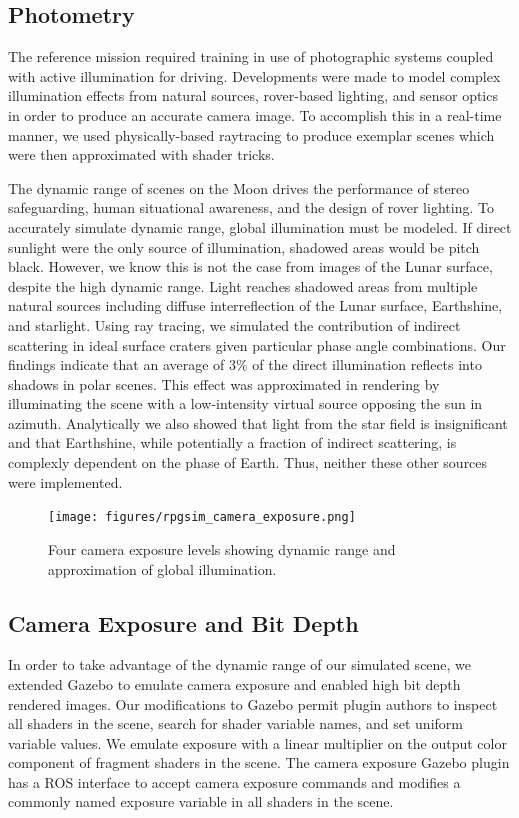 \documentclass[twocolumn,letterpaper]{IEEEAerospaceCLS}  %
\begin{document}
\subsection {Photometry}
The reference mission required training in use of photographic systems coupled with active illumination for driving. 
Developments were made to model complex illumination effects from natural sources, rover-based lighting, and sensor optics in order to produce an accurate camera image. 
To accomplish this in a real-time manner, we used physically-based raytracing to produce exemplar scenes which were then approximated with shader tricks. 

The dynamic range of scenes on the Moon drives the performance of stereo safeguarding, human situational awareness, and the design of rover lighting. 
To accurately simulate dynamic range, global illumination must be modeled. 
If direct sunlight were the only source of illumination, shadowed areas would be pitch black. 
However, we know this is not the case from images of the Lunar surface, despite the high dynamic range. 
Light reaches shadowed areas from multiple natural sources including diffuse interreflection of the Lunar surface, Earthshine, and starlight. 
Using ray tracing, we simulated the contribution of indirect scattering in ideal surface craters given particular phase angle combinations. 
Our findings indicate that an average of 3\% of the direct illumination reflects into shadows in polar scenes. 
This effect was approximated in rendering by illuminating the scene with a low-intensity virtual source opposing the sun in azimuth. 
Analytically we also showed that light from the star field is insignificant and that Earthshine, while potentially a fraction of indirect scattering, is complexly dependent on the phase of Earth. 
Thus, neither these other sources were implemented.       

\begin{figure}[h!]
  \texttt{[image: figures/rpgsim\_camera\_exposure.png]}
  \caption{Four camera exposure levels showing dynamic range and approximation of global illumination. }
  \label{fig:cameraexposure}
\end{figure}

\subsection{Camera Exposure and Bit Depth}
In order to take advantage of the dynamic range of our simulated scene, we extended Gazebo to emulate camera exposure and enabled high bit depth rendered images. 
Our modifications to Gazebo permit plugin authors to inspect all shaders in the scene, search for shader variable names, and set uniform variable values. 
We emulate exposure with a linear multiplier on the output color component of fragment shaders in the scene. 
The camera exposure Gazebo plugin has a ROS interface to accept camera exposure commands and modifies a commonly named exposure  variable in all shaders in the scene. 
\end{document}
